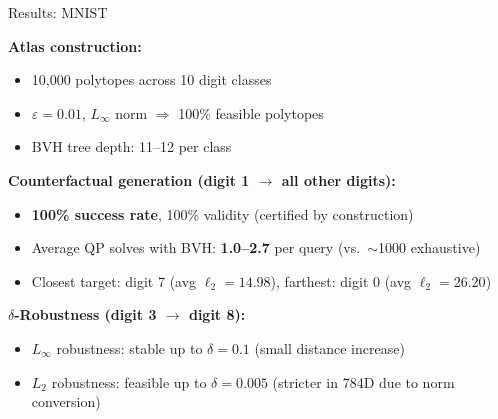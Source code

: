 \documentclass[aspectratio=169, 10pt]{beamer}
\begin{document}
\begin{frame}{Results: MNIST}

\textbf{Atlas construction:}
\begin{itemize}
  \item 10,000 polytopes across 10 digit classes
  \item $\varepsilon = 0.01$, $L_\infty$ norm $\Rightarrow$ 100\% feasible polytopes
  \item BVH tree depth: 11--12 per class
\end{itemize}

\bigskip

\textbf{Counterfactual generation (digit 1 $\to$ all other digits):}
\begin{itemize}
  \item \textbf{100\% success rate}, 100\% validity (certified by construction)
  \item Average QP solves with BVH: \textbf{1.0--2.7} per query (vs.\ $\sim$1000 exhaustive)
  \item Closest target: digit 7 (avg $\ell_2 = 14.98$), farthest: digit 0 (avg $\ell_2 = 26.20$)
\end{itemize}

\bigskip

\textbf{$\delta$-Robustness (digit 3 $\to$ digit 8):}
\begin{itemize}
  \item $L_\infty$ robustness: stable up to $\delta = 0.1$ (small distance increase)
  \item $L_2$ robustness: feasible up to $\delta = 0.005$ (stricter in 784D due to norm conversion)
\end{itemize}

\end{frame}
\end{document}
